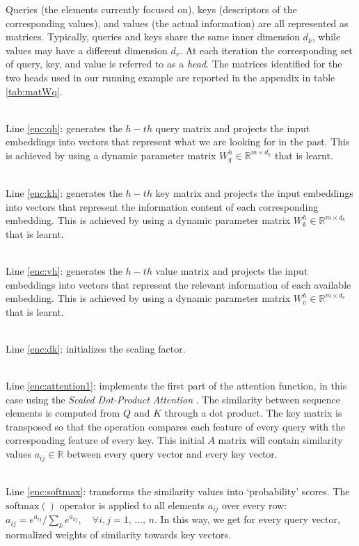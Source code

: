 \documentclass[algorithms,article,submit,pdftex,moreauthors]{Definitions/mdpi}
\begin{document}
Queries (the elements currently focused on), keys (descriptors of the corresponding values), and values (the actual information) are all represented as matrices. Typically, queries and keys share the same inner dimension $d_k$, while values may have a different dimension $d_v$. At each iteration the corresponding set of query, key, and value is referred to as a \textit{head}. The matrices identified for the two heads used in our running example are reported in the appendix in table \ref{tab:matWq}.

~\\Line \ref{enc:qh}: generates the $h-th$ query matrix and projects the input embeddings into vectors that represent what we are looking for in the past. This is achieved by using a dynamic parameter matrix $W^h_q \in \mathbb{R}^{m \times d_k}$ that is learnt.

~\\Line \ref{enc:kh}: generates the $h-th$ key matrix and projects the input embeddings into vectors that represent the information content of each corresponding embedding. This is achieved by using a dynamic parameter matrix $W^h_k \in \mathbb{R}^{m \times d_k}$ that is learnt.

~\\Line \ref{enc:vh}: generates the $h-th$ value matrix and projects the input embeddings into vectors that represent the relevant information of each available embedding. This is achieved by using a dynamic parameter matrix $W^h_v \in \mathbb{R}^{m \times d_v}$ that is learnt.

~\\Line \ref{enc:dk}: initializes the scaling factor.

~\\Line \ref{enc:attention1}: implements the first part of the attention function, in this case using the \textit{Scaled Dot-Product Attention} \cite{VSPU17}. The similarity between sequence elements is computed from $Q$ and $K$ through a dot product. The key matrix is transposed so that the operation compares each feature of every query with the corresponding feature of every key. This initial $A$ matrix will contain similarity values $a_{ij} \in \mathbb{R}$ between every query vector and every key vector. 

~\\Line \ref{enc:softmax}: transforms the similarity values into `probability' scores. The $\text{softmax}()$ operator is applied to all elements $a_{ij}$ over every row: $a_{ij} = e^{a_{ij}} / \sum_k e^{a_{kj}},\quad \forall i,j  = 1,\,...,\,n $. In this way, we get for every query vector, normalized weights of similarity towards key vectors. 
\end{document}
